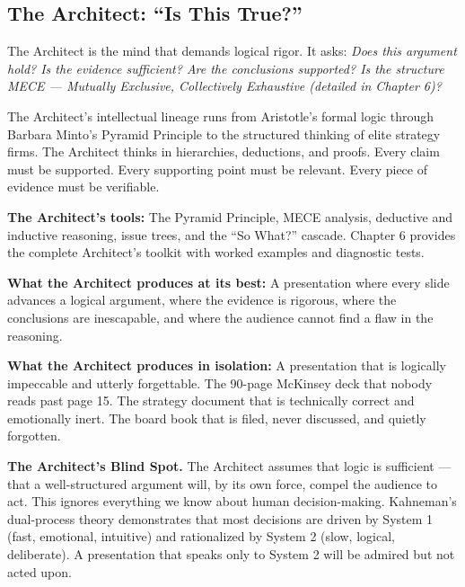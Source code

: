 \subsection{The Architect: ``Is This True?''}

The Architect is the mind that demands logical rigor. It asks: \emph{Does this argument hold? Is the evidence sufficient? Are the conclusions supported? Is the structure MECE --- Mutually Exclusive, Collectively Exhaustive (detailed in Chapter 6)?}

The Architect's intellectual lineage runs from Aristotle's formal logic through Barbara Minto's Pyramid Principle to the structured thinking of elite strategy firms. The Architect thinks in hierarchies, deductions, and proofs. Every claim must be supported. Every supporting point must be relevant. Every piece of evidence must be verifiable.

\textbf{The Architect's tools:} The Pyramid Principle, MECE analysis, deductive and inductive reasoning, issue trees, and the ``So What?'' cascade. Chapter 6 provides the complete Architect's toolkit with worked examples and diagnostic tests.

\textbf{What the Architect produces at its best:} A presentation where every slide advances a logical argument, where the evidence is rigorous, where the conclusions are inescapable, and where the audience cannot find a flaw in the reasoning.

\textbf{What the Architect produces in isolation:} A presentation that is logically impeccable and utterly forgettable. The 90-page McKinsey deck that nobody reads past page 15. The strategy document that is technically correct and emotionally inert. The board book that is filed, never discussed, and quietly forgotten.

\begin{diagnosisbox}
\textbf{The Architect's Blind Spot.} The Architect assumes that logic is sufficient --- that a well-structured argument will, by its own force, compel the audience to act. This ignores everything we know about human decision-making. Kahneman's dual-process theory demonstrates that most decisions are driven by System 1 (fast, emotional, intuitive) and rationalized by System 2 (slow, logical, deliberate). A presentation that speaks only to System 2 will be admired but not acted upon.
\end{diagnosisbox}

